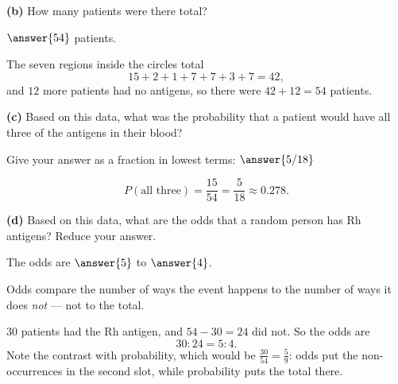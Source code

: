\documentclass[12pt]{ximera}
\begin{document}
\begin{problem}
\begin{prompt}
\textbf{(b)} How many patients were there total?

$\answer{54}$ patients.

\begin{solution}
The seven regions inside the circles total
\[ 15+2+1+7+7+3+7=42, \]
and $12$ more patients had no antigens, so there were $42+12=54$ patients.
\end{solution}
\end{prompt}

\begin{prompt}
\textbf{(c)} Based on this data, what was the probability that a patient would have
all three of the antigens in their blood?

Give your answer as a fraction in lowest terms: $\answer{5/18}$

\begin{solution}
\[
P(\text{all three})=\frac{15}{54}=\frac{5}{18}\approx 0.278.
\]
\end{solution}
\end{prompt}

\begin{prompt}
\textbf{(d)} Based on this data, what are the odds that a random person has Rh
antigens? Reduce your answer.

The odds are $\answer{5}$ to $\answer{4}$.

\begin{hint}
Odds compare the number of ways the event happens to the number of ways it does
\emph{not} --- not to the total.
\end{hint}

\begin{solution}
$30$ patients had the Rh antigen, and $54-30=24$ did not. So the odds are
\[ 30:24 = 5:4. \]
Note the contrast with probability, which would be $\frac{30}{54}=\frac{5}{9}$: odds
put the non-occurrences in the second slot, while probability puts the total there.
\end{solution}
\end{prompt}
\end{problem}
\end{document}
